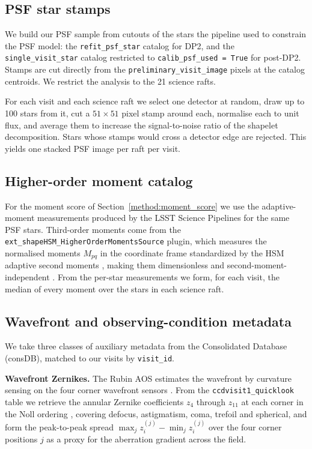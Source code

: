 \documentclass[]{spie}
\begin{document}
\subsection{PSF star stamps}
\label{data:stamps}

We build our PSF sample from cutouts of the stars the pipeline used to constrain the PSF
model: the \texttt{refit\_psf\_star} catalog for DP2, and the \texttt{single\_visit\_star}
catalog restricted to \texttt{calib\_psf\_used = True} for post-DP2. Stamps are cut
directly from the \texttt{preliminary\_visit\_image} pixels at the catalog centroids. We
restrict the analysis to the 21 science rafts.

For each visit and each science raft we select one detector at random, draw up to 100
stars from it, cut a $51 \times 51$ pixel stamp around each, normalise each to unit flux,
and average them to increase the signal-to-noise ratio of the shapelet decomposition.
Stars whose stamps would cross a detector edge are rejected. This yields one stacked PSF
image per raft per visit.

\subsection{Higher-order moment catalog}
\label{data:moments}

For the moment score of Section~\ref{method:moment_score} we use the adaptive-moment
measurements produced by the LSST Science Pipelines for the same PSF stars. Third-order
moments come from the \texttt{ext\_shapeHSM\_HigherOrderMomentsSource} plugin, which
measures the normalised moments $M_{pq}$ in the coordinate frame standardized by the HSM
adaptive second moments \cite{HirataSeljak2003, BernsteinJarvis2002}, making them
dimensionless and second-moment-independent \cite{Zhang2023}. From the per-star measurements we form, for each visit, the
median of every moment over the stars in each science raft.

\subsection{Wavefront and observing-condition metadata}
\label{data:zernike}

We take three classes of auxiliary metadata from the Consolidated Database (consDB), matched
to our visits by \texttt{visit\_id}.

\textbf{Wavefront Zernikes.} The Rubin AOS estimates the wavefront by curvature sensing on
the four corner wavefront sensors \cite{Xin2015}. From the \texttt{ccdvisit1\_quicklook}
table we retrieve the annular Zernike coefficients $z_4$ through $z_{11}$ at each corner in
the Noll ordering \cite{Noll1976}, covering defocus, astigmatism, coma, trefoil and
spherical, and form the peak-to-peak spread $\max_j z_i^{(j)} - \min_j z_i^{(j)}$ over the
four corner positions $j$ as a proxy for the aberration gradient across the field.
\end{document}

